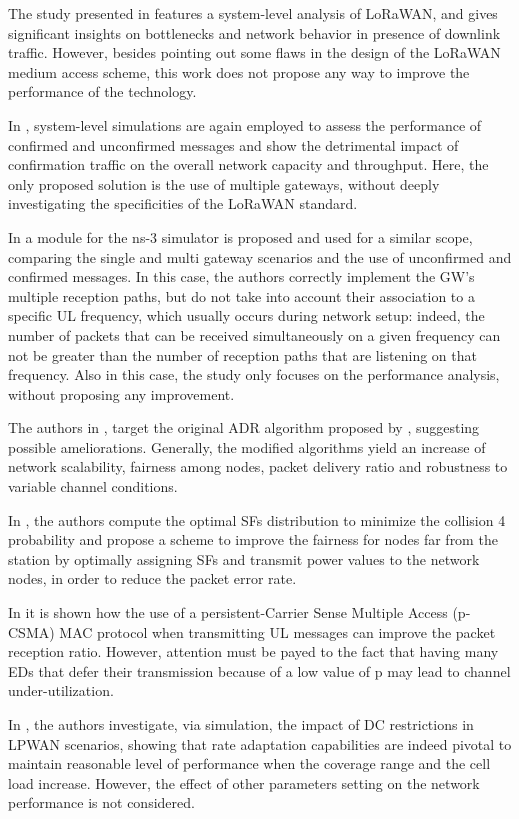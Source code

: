 The study presented in \cite{pop_does_2017} features a system-level analysis of LoRaWAN,
	and gives significant insights on bottlenecks and network behavior in presence of downlink traffic.
However,
	besides pointing out some flaws in the design of the LoRaWAN medium access scheme,
	this work does not propose any way to improve the performance of the technology.


In \cite{vandenabeele_scalability_2017},
	system-level simulations are again employed to assess the performance of confirmed and unconfirmed messages and show the detrimental impact of confirmation traffic on the overall network capacity and throughput.
Here,
	the only proposed solution is the use of multiple gateways,
	without deeply investigating the specificities of the LoRaWAN standard.


In \cite{reynders_lorawan_2018} a module for the ns-3 simulator is proposed and used for a similar scope,
	comparing the single and multi gateway scenarios and the use of unconfirmed and confirmed messages.
In this case,
	the authors correctly implement the GW’s multiple reception paths,
	but do not take into account their association to a specific UL frequency,
	which usually occurs during network setup:
	indeed,
	the number of packets that can be received simultaneously on a given frequency can not be greater than the number of reception paths that are listening on that frequency.
Also in this case,
	the study only focuses on the performance analysis,
	without proposing any improvement.


The authors in \cite{hauser_proposal_2017},
	\cite{slabicki_adaptive_2018} target the original ADR algorithm proposed by \cite{thethingsnetwork},
	suggesting possible ameliorations.
Generally,
	the modified algorithms yield an increase of network scalability,
	fairness among nodes,
	packet delivery ratio and robustness to variable channel conditions.



In \cite{reynders_power_2017},
	the authors compute the optimal SFs distribution to minimize the collision 4 probability and propose a scheme to improve the fairness for nodes far from the station by optimally assigning SFs and transmit power values to the network nodes,
	in order to reduce the packet error rate.



In \cite{kouvelas_employing_2018} it is shown how the use of a persistent-Carrier Sense Multiple Access (p-CSMA) MAC protocol when transmitting UL messages can improve the packet reception ratio.
However,
	attention must be payed to the fact that having many EDs that defer their transmission because of a low value of p may lead to channel under-utilization.



In \cite{zucchetto_uncoordinated_2017},
	the authors investigate,
	via simulation,
	the impact of \ac{DC} restrictions in LPWAN scenarios,
	showing that rate adaptation capabilities are indeed pivotal to maintain reasonable level of performance when the coverage range and the cell load increase.
However,
	the effect of other parameters setting on the network performance is not considered.



